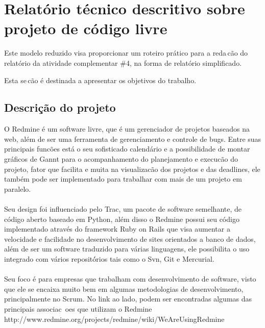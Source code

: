 \documentclass[12pt,a4paper]{article} %
\newcommand\BackgroundStructure{ %
\setlength{\unitlength}{1mm} %

\setlength\fboxsep{0mm} %
\setlength\fboxrule{0.5mm} %
\put(10, 20pr){\fcolorbox{black}{gray!5}{\framebox(155,247){}}} %
\put(165, 20){\fcolorbox{black}{gray!10}{\framebox(37,247){}}} %
\put(10, 262){\fcolorbox{black}{white!10}{\framebox(192, 25){}}} %
\put(175, 263){\texttt{[image: ]}} %
}
\begin{document}


\section{Relat\'orio t\'ecnico descritivo sobre projeto de c\'odigo livre} 

Este modelo reduzido visa proporcionar um roteiro pr\'atico para a reda\,c\~ao do relat\'orio da atividade complementar \#4, na forma de relat\'orio simplificado. 

Esta se\,c\~ao \'e destinada a apresentar os objetivos do trabalho.\\

\subsection{Descriç\~ao do projeto}

O Redmine \'e um software livre, que \'e um gerenciador de projetos baseados na web, al\'em de ser uma ferramenta de gerenciamento e controle de bugs. Entre suas principais func\~oes est\'a o seu sofisticado calend\'ario e a possibilidade de montar gr\'aficos de Gannt para o acompanhamento do planejamento e execuc\~ao do projeto, fator que facilita e muita na visualizac\~ao dos projetos e das deadlines, ele tamb\'em pode ser implementado para trabalhar com mais de um projeto em paralelo.\\
\\
Seu design foi influenciado pelo Trac, um pacote de software semelhante, de c\'odigo aberto baseado em Python, al\'em disso o Redmine possui seu c\'odigo implementado através do framework Ruby on Rails que visa aumentar a velocidade e facilidade no desenvolvimento de sites orientados a banco de dados, al\'em de ser um software traduzido para v\'arias linguagens, ele possibilita o uso integrado com v\'arios reposit\'órios tais como o Svn, Git e Mercurial.\\
\\
Seu foco \'e para empresas que trabalham com desenvolvimento de software, visto que ele se encaixa muito bem em algumas metodologias de desenvolvimento, principalmente no Scrum. No link ao lado, podem ser encontradas algumas das principais associac~oes que utilizam o Redmine http://www.redmine.org/projects/redmine/wiki/WeAreUsingRedmine
\end{document}
